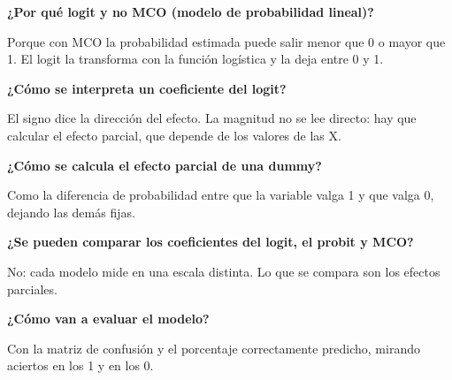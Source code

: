 \documentclass[11pt]{article}
\begin{document}
\textbf{¿Por qué logit y no MCO (modelo de probabilidad lineal)?}\par
\begin{guion}Porque con MCO la probabilidad estimada puede salir menor que 0 o mayor que 1. El logit la transforma con la función logística y la deja entre 0 y 1.\end{guion}

\textbf{¿Cómo se interpreta un coeficiente del logit?}\par
\begin{guion}El signo dice la dirección del efecto. La magnitud no se lee directo: hay que calcular el efecto parcial, que depende de los valores de las X.\end{guion}

\textbf{¿Cómo se calcula el efecto parcial de una dummy?}\par
\begin{guion}Como la diferencia de probabilidad entre que la variable valga 1 y que valga 0, dejando las demás fijas.\end{guion}

\textbf{¿Se pueden comparar los coeficientes del logit, el probit y MCO?}\par
\begin{guion}No: cada modelo mide en una escala distinta. Lo que se compara son los efectos parciales.\end{guion}

\textbf{¿Cómo van a evaluar el modelo?}\par
\begin{guion}Con la matriz de confusión y el porcentaje correctamente predicho, mirando aciertos en los 1 y en los 0.\end{guion}
\end{document}
